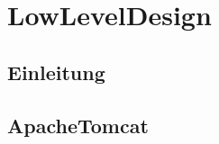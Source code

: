 \documentclass{scrbook}
\begin{document}
\frontmatter
\maketitle
\tableofcontents
\mainmatter

\setcounter{part}{1}
\part{LowLevelDesign}
\chapter*{Einleitung}

\chapter{ApacheTomcat}
 
\end{document}

